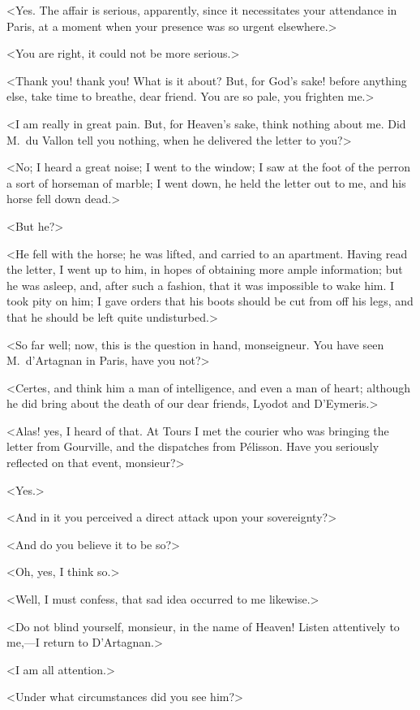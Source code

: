 <Yes. The affair is serious, apparently, since it necessitates your attendance in Paris, at a moment when your presence was so urgent elsewhere.>

<You are right, it could not be more serious.>

<Thank you! thank you! What is it about? But, for God's sake! before anything else, take time to breathe, dear friend. You are so pale, you frighten me.>

<I am really in great pain. But, for Heaven's sake, think nothing about me. Did M.~du Vallon tell you nothing, when he delivered the letter to you?>

<No; I heard a great noise; I went to the window; I saw at the foot of the perron a sort of horseman of marble; I went down, he held the letter out to me, and his horse fell down dead.>

<But he?>

<He fell with the horse; he was lifted, and carried to an apartment. Having read the letter, I went up to him, in hopes of obtaining more ample information; but he was asleep, and, after such a fashion, that it was impossible to wake him. I took pity on him; I gave orders that his boots should be cut from off his legs, and that he should be left quite undisturbed.>

<So far well; now, this is the question in hand, monseigneur. You have seen M.~d'Artagnan in Paris, have you not?>

<Certes, and think him a man of intelligence, and even a man of heart; although he did bring about the death of our dear friends, Lyodot and D'Eymeris.>

<Alas! yes, I heard of that. At Tours I met the courier who was bringing the letter from Gourville, and the dispatches from Pélisson. Have you seriously reflected on that event, monsieur?>

<Yes.>

<And in it you perceived a direct attack upon your sovereignty?>

<And do you believe it to be so?>

<Oh, yes, I think so.>

<Well, I must confess, that sad idea occurred to me likewise.>

<Do not blind yourself, monsieur, in the name of Heaven! Listen attentively to me,—I return to D'Artagnan.>

<I am all attention.>

<Under what circumstances did you see him?>

